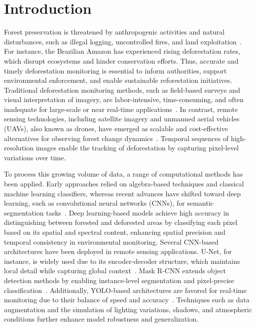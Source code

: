\documentclass[journal,article,submit,pdftex,moreauthors]{Definitions/mdpi}
\begin{document}
\section{Introduction}

Forest preservation is threatened by anthropogenic activities and natural disturbances, such as illegal logging, uncontrolled fires, and land exploitation~\cite{g1,g2,g3}. For instance, the Brazilian Amazon has experienced rising deforestation rates, which disrupt ecosystems and hinder conservation efforts. Thus, accurate and timely deforestation monitoring is essential to inform authorities, support environmental enforcement, and enable sustainable reforestation initiatives. Traditional deforestation monitoring methods, such as field-based surveys and visual interpretation of imagery, are labor-intensive, time-consuming, and often inadequate for large-scale or near real-time applications~\cite{g1, g2}. In contrast, remote sensing technologies, including satellite imagery and unmanned aerial vehicles (UAVs), also known as drones, have emerged as scalable and cost-effective alternatives for observing forest change dynamics~\cite{g1, g4, g5, g6, g7, g8}. Temporal sequences of high-resolution images enable the tracking of deforestation by capturing pixel-level variations over time.


To process this growing volume of data, a range of computational methods has been applied. Early approaches relied on algebra-based techniques and classical machine learning classifiers, whereas recent advances have shifted toward deep learning, such as convolutional neural networks (CNNs), for semantic segmentation tasks~\cite{g1, g4, g5, g6, g7, g8}. Deep learning-based models achieve high accuracy in distinguishing between forested and deforested areas by classifying each pixel based on its spatial and spectral content, enhancing spatial precision and temporal consistency in environmental monitoring. Several CNN-based architectures have been deployed in remote sensing applications. U-Net, for instance, is widely used due to its encoder-decoder structure, which maintains local detail while capturing global context~\cite{g4,g5}. Mask R-CNN extends object detection methods by enabling instance-level segmentation and pixel-precise classification~\cite{g10,g11,g12}. Additionally, YOLO-based architectures are favored for real-time monitoring due to their balance of speed and accuracy~\cite{g10,g16,rs17183170}. Techniques such as data augmentation and the simulation of lighting variations, shadows, and atmospheric conditions further enhance model robustness and generalization.
\end{document}
